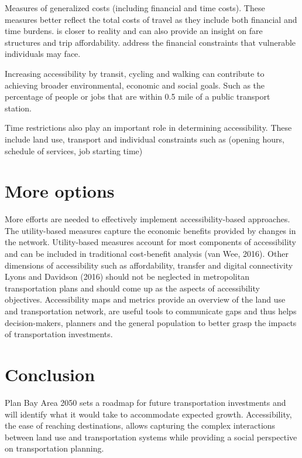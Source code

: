 \documentclass[12pt,]{article}
\begin{document}
Measures of generalized costs (including financial and time costs).
These measures better reflect the total costs of travel as they include
both financial and time burdens. is closer to reality and can also
provide an insight on fare structures and trip affordability. address
the financial constraints that vulnerable individuals may face.

Increasing accessibility by transit, cycling and walking can contribute
to achieving broader environmental, economic and social goals. Such as
the percentage of people or jobs that are within 0.5 mile of a public
transport station.

Time restrictions also play an important role in determining
accessibility. These include land use, transport and individual
constraints such as (opening hours, schedule of services, job starting
time)

\hypertarget{more-options}{%
\section{More options}\label{more-options}}

More efforts are needed to effectively implement accessibility-based
approaches. The utility-based measures capture the economic benefits
provided by changes in the network. Utility-based measures account for
most components of accessibility and can be included in traditional
cost-benefit analysis (van Wee, 2016). Other dimensions of accessibility
such as affordability, transfer and digital connectivity Lyons and
Davidson (2016) should not be neglected in metropolitan transportation
plans and should come up as the aspects of accessibility objectives.
Accessibility maps and metrics provide an overview of the land use and
transportation network, are useful tools to communicate gaps and thus
helps decision-makers, planners and the general population to better
grasp the impacts of transportation investments.

\hypertarget{conclusion}{%
\section{Conclusion}\label{conclusion}}

Plan Bay Area 2050 sets a roadmap for future transportation investments
and will identify what it would take to accommodate expected growth.
Accessibility, the ease of reaching destinations, allows capturing the
complex interactions between land use and transportation systems while
providing a social perspective on transportation planning.
\end{document}
